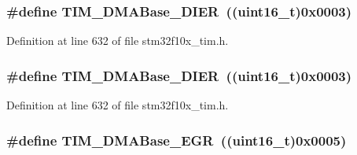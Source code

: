 \subsubsection[{\texorpdfstring{T\+I\+M\+\_\+\+D\+M\+A\+Base\+\_\+\+D\+I\+ER}{TIM_DMABase_DIER}}]{\setlength{\rightskip}{0pt plus 5cm}\#define T\+I\+M\+\_\+\+D\+M\+A\+Base\+\_\+\+D\+I\+ER~(({\bf uint16\+\_\+t})0x0003)}\hypertarget{group___t_i_m___d_m_a___base__address_gaeddacbbc2adf9705feac250f077d8c93}{}\label{group___t_i_m___d_m_a___base__address_gaeddacbbc2adf9705feac250f077d8c93}


Definition at line 632 of file stm32f10x\+\_\+tim.\+h.

\subsubsection[{\texorpdfstring{T\+I\+M\+\_\+\+D\+M\+A\+Base\+\_\+\+D\+I\+ER}{TIM_DMABase_DIER}}]{\setlength{\rightskip}{0pt plus 5cm}\#define T\+I\+M\+\_\+\+D\+M\+A\+Base\+\_\+\+D\+I\+ER~(({\bf uint16\+\_\+t})0x0003)}\hypertarget{group___t_i_m___d_m_a___base__address_gaeddacbbc2adf9705feac250f077d8c93}{}\label{group___t_i_m___d_m_a___base__address_gaeddacbbc2adf9705feac250f077d8c93}


Definition at line 632 of file stm32f10x\+\_\+tim.\+h.

\subsubsection[{\texorpdfstring{T\+I\+M\+\_\+\+D\+M\+A\+Base\+\_\+\+E\+GR}{TIM_DMABase_EGR}}]{\setlength{\rightskip}{0pt plus 5cm}\#define T\+I\+M\+\_\+\+D\+M\+A\+Base\+\_\+\+E\+GR~(({\bf uint16\+\_\+t})0x0005)}\hypertarget{group___t_i_m___d_m_a___base__address_gab5e6f6c3fea100896d13ce317a6ccd8e}{}\label{group___t_i_m___d_m_a___base__address_gab5e6f6c3fea100896d13ce317a6ccd8e}


